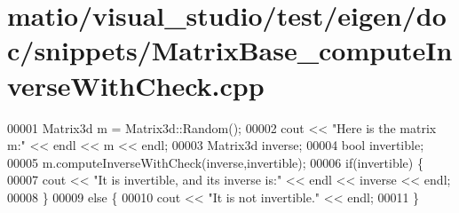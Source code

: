 \hypertarget{matio_2visual__studio_2test_2eigen_2doc_2snippets_2_matrix_base__compute_inverse_with_check_8cpp_source}{}\section{matio/visual\+\_\+studio/test/eigen/doc/snippets/\+Matrix\+Base\+\_\+compute\+Inverse\+With\+Check.cpp}
\label{matio_2visual__studio_2test_2eigen_2doc_2snippets_2_matrix_base__compute_inverse_with_check_8cpp_source}

\begin{DoxyCode}
00001 Matrix3d m = Matrix3d::Random();
00002 cout << \textcolor{stringliteral}{"Here is the matrix m:"} << endl << m << endl;
00003 Matrix3d inverse;
00004 \textcolor{keywordtype}{bool} invertible;
00005 m.computeInverseWithCheck(inverse,invertible);
00006 \textcolor{keywordflow}{if}(invertible) \{
00007   cout << \textcolor{stringliteral}{"It is invertible, and its inverse is:"} << endl << inverse << endl;
00008 \}
00009 \textcolor{keywordflow}{else} \{
00010   cout << \textcolor{stringliteral}{"It is not invertible."} << endl;
00011 \}
\end{DoxyCode}
